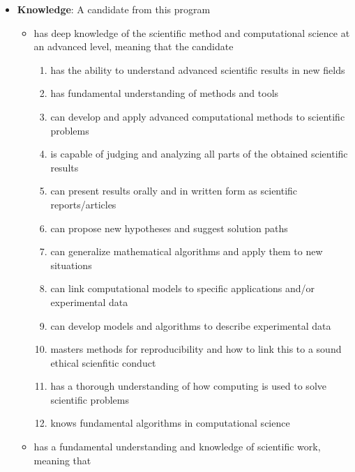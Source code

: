 \documentclass{article}
\begin{document}
\begin{itemize}
\item \textbf{Knowledge}: A candidate from this program
\begin{itemize}

 \item has deep knowledge of the scientific method and computational science at an advanced level, meaning that the candidate
\begin{enumerate}

 \item has the ability to understand advanced scientific results in new fields

 \item has fundamental understanding of methods and tools

 \item can develop and apply advanced computational methods to scientific problems

 \item is capable of judging and analyzing all parts of the obtained scientific results

 \item can present results orally and in written form as scientific reports/articles

 \item can propose new hypotheses and suggest solution paths

 \item can generalize mathematical algorithms and apply them to new situations

 \item can link computational models to specific applications and/or experimental data

 \item can develop models and algorithms to describe experimental data

\item masters methods for reproducibility and how to link this to a sound ethical scienfitic conduct

\item has a thorough understanding of how computing is used to  solve  scientific problems
\item knows fundamental algorithms in computational science

\end{enumerate}

\noindent
 \item has a fundamental understanding and knowledge of scientific work, meaning that
\begin{enumerate}


\end{enumerate}
\end{itemize}
\end{itemize}
\end{document}
